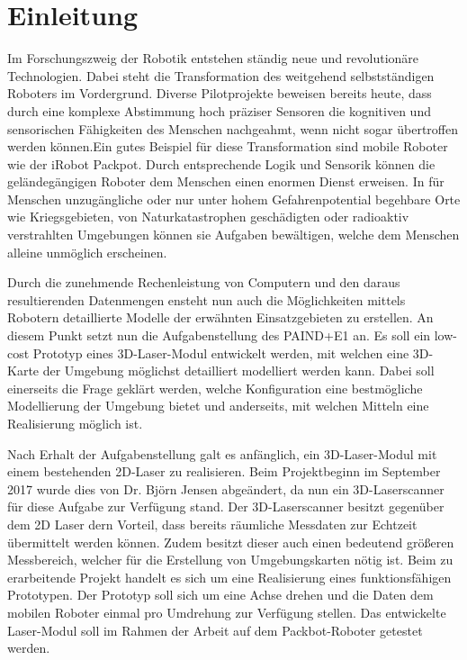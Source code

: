 
\chapter{Einleitung}

Im Forschungszweig der Robotik entstehen ständig neue und revolutionäre Technologien. Dabei steht die Transformation des weitgehend selbstständigen Roboters im Vordergrund. Diverse Pilotprojekte beweisen bereits heute, dass durch eine komplexe Abstimmung hoch präziser Sensoren die kognitiven und sensorischen Fähigkeiten des Menschen nachgeahmt, wenn nicht sogar übertroffen werden können.Ein gutes Beispiel für diese Transformation sind mobile Roboter wie der iRobot Packpot. Durch entsprechende Logik und Sensorik können die geländegängigen Roboter dem Menschen einen enormen Dienst erweisen. In für Menschen unzugängliche oder nur unter hohem Gefahrenpotential begehbare Orte wie Kriegsgebieten, von Naturkatastrophen geschädigten oder radioaktiv verstrahlten Umgebungen können sie Aufgaben bewältigen, welche dem Menschen alleine unmöglich erscheinen.

Durch die zunehmende Rechenleistung von Computern und den daraus resultierenden Datenmengen ensteht nun auch die Möglichkeiten mittels Robotern detaillierte Modelle der erwähnten Einsatzgebieten zu erstellen. An diesem Punkt setzt nun die Aufgabenstellung des PAIND+E1 an. Es soll ein low-cost Prototyp eines 3D-Laser-Modul entwickelt werden, mit welchen eine 3D-Karte der Umgebung möglichst detailliert modelliert werden kann. Dabei soll einerseits die Frage geklärt werden, welche Konfiguration eine bestmögliche Modellierung der Umgebung bietet und anderseits, mit welchen Mitteln eine Realisierung möglich ist.

Nach Erhalt der Aufgabenstellung galt es anfänglich, ein 3D-Laser-Modul mit einem bestehenden 2D-Laser zu realisieren. Beim Projektbeginn im September 2017 wurde dies von Dr. Björn Jensen abgeändert, da nun ein 3D-Laserscanner für diese Aufgabe zur Verfügung stand. Der 3D-Laserscanner besitzt gegenüber dem 2D Laser dern Vorteil, dass bereits räumliche Messdaten zur Echtzeit übermittelt werden können. Zudem besitzt dieser auch einen bedeutend größeren Messbereich, welcher für die Erstellung von Umgebungskarten nötig ist. Beim zu erarbeitende Projekt handelt es sich um eine Realisierung eines funktionsfähigen Prototypen. Der Prototyp soll sich um eine Achse drehen und die Daten dem mobilen Roboter einmal pro Umdrehung zur Verfügung stellen. Das entwickelte Laser-Modul soll im Rahmen der Arbeit auf dem Packbot-Roboter getestet werden.

